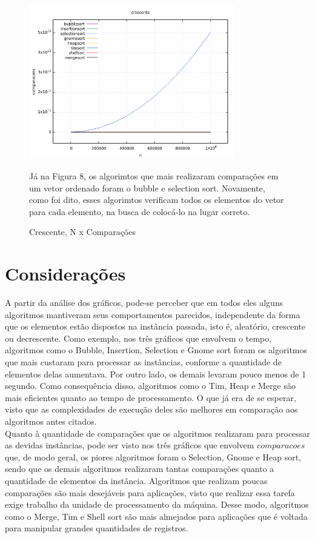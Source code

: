 \documentclass[report]{uftex}
\begin{document}
\begin{figure}[h]
\centering
\caption{Crescente, N x Comparações}
\includegraphics[width=0.8\textwidth]{graphs/crescente-comparações.png}

Já na Figura 8, os algorimtos que mais realizaram comparações em um vetor ordenado foram o bubble e selection sort. Novamente, como foi dito, esses algorimtos verificam todos os elementos do vetor para cada elemento, na busca de colocá-lo na lugar correto.

\end{figure}

\section{Considerações}
A partir da análise dos gráficos, pode-se perceber que em todos eles alguns algoritmos mantiveram seus comportamentos parecidos, independente da forma que os elementos estão dispostos na instância passada, isto é, aleatório, crescente ou decrescente. Como exemplo, nos três gráficos que envolvem o tempo, algoritmos como o Bubble, Insertion, Selection e Gnome sort foram os algoritmos que mais custaram para processar as instâncias, conforme a quantidade de elementos delas aumentava. Por outro lado, os demais levaram pouco menos de 1 segundo. Como consequência disso, algoritmos como o Tim, Heap e Merge são mais eficientes quanto ao tempo de processamento. O que já era de se esperar, visto que as complexidades de execução deles são melhores em comparação aos algoritmos antes citados.\\

	Quanto à quantidade de comparações que os algoritmos realizaram para processar as devidas instâncias, pode ser visto nos três gráficos que envolvem $comparacoes$ que, de modo geral, os piores algoritmos foram o Selection, Gnome e Heap sort, sendo que os demais algoritmos realizaram tantas comparações quanto a quantidade de elementos da instância. Algoritmos que realizam poucas comparações são mais desejáveis para aplicações, visto que realizar essa tarefa exige trabalho da unidade de processamento da máquina. Desse modo, algoritmos como o Merge, Tim e Shell sort são mais almejados para aplicações que é voltada para manipular grandes quantidades de registros.\\
\end{document}
